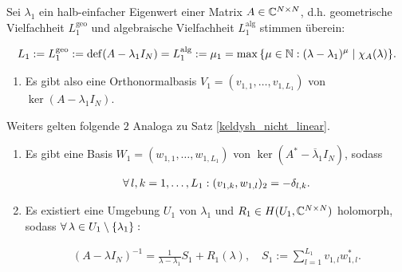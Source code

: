\begin{theorem} \label{keldysh_linear}

    Sei $\lambda_1$ ein halb-einfacher Eigenwert einer Matrix $A \in \mathbb{C}^{N \times N}$, d.h. geometrische Vielfachheit $L_1^\mathrm{geo}$ und algebraische Vielfachheit $L_1^\mathrm{alg}$ stimmen überein:

    \begin{align*}
        L_1
        :=
        L_1^\mathrm{geo} := \operatorname{def}(A - \lambda_1 I_N)
        =
        L_1^\mathrm{alg} := \mu_1 = \max {\left \{ \mu \in \mathbb{N}: (\lambda - \lambda_1)^\mu \mid \chi_A(\lambda) \right \}}.
    \end{align*}

    \begin{enumerate}[label = (\roman*)]
        \item Es gibt also eine Orthonormalbasis $V_1 = (v_{1, 1}, \dots, v_{1, L_1})$ von $\ker (A - \lambda_1 I_N)$.
    \end{enumerate}

    Weiters gelten folgende $2$ Analoga zu Satz \ref{keldysh_nicht_linear}.

    \begin{enumerate}[label = (\roman*), start = 2]

        \item Es gibt eine Basis $W_1 = (w_{1, 1}, \dots, w_{1, L_1})$ von $\ker (A^\ast - \overline \lambda_1 I_N)$, sodass

        \begin{align*}
            \forall \, l, k = 1, \dots, L_1:
            (v_{1, k}, w_{1, l})_2 = -\delta_{l, k}.
        \end{align*}

        \item Es existiert eine Umgebung $U_1$ von $\lambda_1$ und $R_1 \in H(U_1, \mathbb{C}^{N \times N})$ holomorph, sodass $\forall \, \lambda \in U_1 \setminus {\left \{ \lambda_1 \right \}}:$

        \begin{align*}
            (A - \lambda I_N)^{-1}
            =
            \frac{1}{\lambda - \lambda_1} S_1
            +
            R_1(\lambda),
            \quad
            S_1
            :=
            \sum_{l=1}^{L_1}
                v_{1, l} w_{1, l}^\ast.
        \end{align*}

    \end{enumerate}

\end{theorem}
